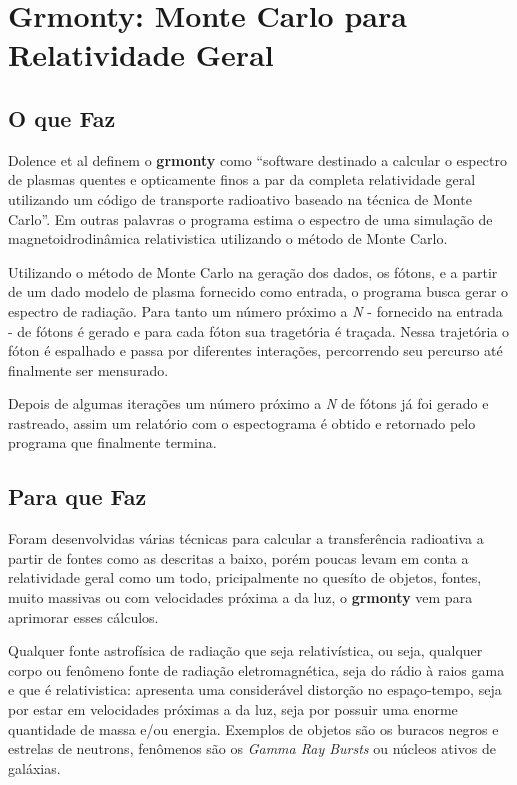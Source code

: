 \chapter{Grmonty: Monte Carlo para Relatividade Geral}
\label{cap:grmonty}

\section{O que Faz}
  Dolence et al definem o \textbf{grmonty} como ``software destinado a calcular o espectro de plasmas quentes e opticamente finos a par da completa relatividade geral utilizando um código de transporte radioativo baseado na técnica de Monte Carlo''\citep[p.1, traduzido]{Dolence:09}. Em outras palavras o programa estima o espectro de uma simulação de magnetoidrodinâmica \cite{eletro-hidro-dynamic} relativistica utilizando o método de Monte Carlo.

  Utilizando o método de Monte Carlo na geração dos dados, os fótons, e a partir de um dado modelo de plasma fornecido como entrada, o programa busca gerar o espectro de radiação. Para tanto um número próximo a \textit{N} - fornecido na entrada - de fótons é gerado e para cada fóton sua tragetória é traçada. Nessa trajetória o fóton é espalhado e passa por diferentes interações, percorrendo seu percurso até finalmente ser mensurado.

  Depois de algumas iterações um número próximo a \textit{N} de fótons já foi gerado e rastreado, assim um relatório com o espectograma é obtido e retornado pelo programa que finalmente termina.

\section{Para que Faz}
  Foram desenvolvidas várias técnicas para calcular a transferência radioativa a partir de fontes como as descritas a baixo\citep{Dolence:09}, porém poucas levam em conta a relatividade geral como um todo, pricipalmente no quesíto de objetos, fontes, muito massivas ou com velocidades próxima a da luz, o \textbf{grmonty} vem para aprimorar esses cálculos.

  Qualquer fonte astrofísica de radiação que seja relativística, ou seja, qualquer corpo ou fenômeno fonte de radiação eletromagnética, seja do rádio à raios gama e que é relativistica: apresenta uma considerável distorção no espaço-tempo, seja por estar em velocidades próximas a da luz, seja por possuir uma enorme quantidade de massa e/ou energia. Exemplos de objetos são os buracos negros e estrelas de neutrons, fenômenos são os \textit{Gamma Ray Bursts} ou núcleos ativos de galáxias.


